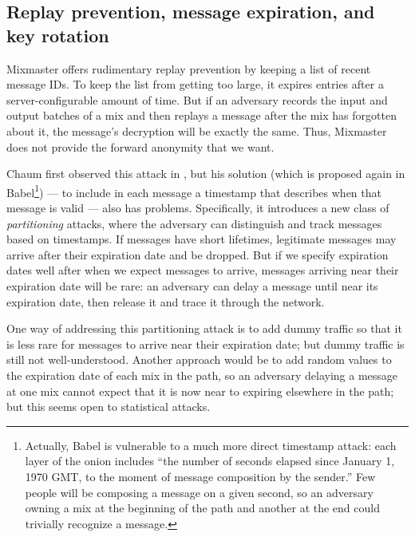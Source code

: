 \documentclass[11pt]{IEEEtran}
\begin{document}
\subsection{Replay prevention, message expiration, and key rotation}

Mixmaster offers rudimentary replay prevention by keeping a list of recent
message IDs. To keep the list from getting too large, it expires entries
after a server-configurable amount of time. But if an adversary records
the input and output batches of a mix and then replays a message after
the mix has forgotten about it, the message's decryption will be exactly
the same. Thus, Mixmaster does not provide the forward anonymity that we want.

Chaum first observed this attack in \cite{chaum-mix},
but his solution (which is proposed again in Babel\footnote{
  Actually, Babel is vulnerable to a much more direct timestamp attack:
  each layer of the onion includes ``the number of seconds
  elapsed since January 1, 1970 GMT, to the moment of message composition
  by the sender.'' Few people will be composing a message on a given
  second, so an adversary owning a mix at the beginning of the path and
  another at the end could trivially recognize a message.
}) --- to include in each message a timestamp that describes when that message
is valid --- also has problems. Specifically, it introduces a new class
of \emph{partitioning} attacks, where the adversary can distinguish and
track messages based on timestamps. If messages have short lifetimes,
legitimate messages may arrive after their expiration date and be
dropped. But if we specify expiration dates well after when we expect
messages to arrive, messages arriving near their expiration date will be
rare: an adversary can delay a message until near its expiration date,
then release it and trace it through the network.


One way of addressing this partitioning attack is to add dummy traffic
so that it is less rare for messages to arrive near their expiration date;
but dummy traffic is still not well-understood. Another approach would
be to add random values to the expiration date of each mix in the path,
so an adversary delaying a message at one mix cannot expect that it
is now near to expiring elsewhere in the path; but this seems open to
statistical attacks.

\end{document}
